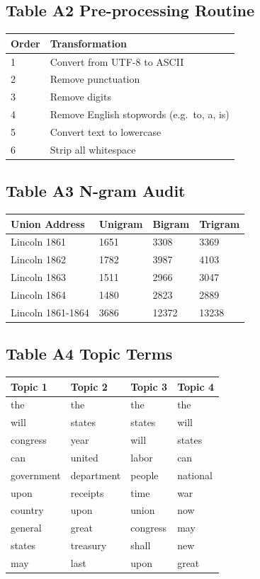 \documentclass[]{article}
\begin{document}
\subsection{Table A2 Pre-processing
Routine}\label{table-a2-pre-processing-routine}

\begin{longtable}[]{@{}ll@{}}
\toprule
Order & Transformation\tabularnewline
\midrule
\endhead
1 & Convert from UTF-8 to ASCII\tabularnewline
2 & Remove punctuation\tabularnewline
3 & Remove digits\tabularnewline
4 & Remove English stopwords (e.g.~to, a, is)\tabularnewline
5 & Convert text to lowercase\tabularnewline
6 & Strip all whitespace\tabularnewline
\bottomrule
\end{longtable}

\subsection{Table A3 N-gram Audit}\label{table-a3-n-gram-audit}

\begin{longtable}[]{@{}llll@{}}
\toprule
Union Address & Unigram & Bigram & Trigram\tabularnewline
\midrule
\endhead
Lincoln 1861 & 1651 & 3308 & 3369\tabularnewline
Lincoln 1862 & 1782 & 3987 & 4103\tabularnewline
Lincoln 1863 & 1511 & 2966 & 3047\tabularnewline
Lincoln 1864 & 1480 & 2823 & 2889\tabularnewline
Lincoln 1861-1864 & 3686 & 12372 & 13238\tabularnewline
\bottomrule
\end{longtable}

\subsection{Table A4 Topic Terms}\label{table-a4-topic-terms}

\begin{longtable}[]{@{}llll@{}}
\toprule
Topic 1 & Topic 2 & Topic 3 & Topic 4\tabularnewline
\midrule
\endhead
the & the & the & the\tabularnewline
will & states & states & will\tabularnewline
congress & year & will & states\tabularnewline
can & united & labor & can\tabularnewline
government & department & people & national\tabularnewline
upon & receipts & time & war\tabularnewline
country & upon & union & now\tabularnewline
general & great & congress & may\tabularnewline
states & treasury & shall & new\tabularnewline
may & last & upon & great\tabularnewline
\bottomrule
\end{longtable}

\newpage
\end{document}
